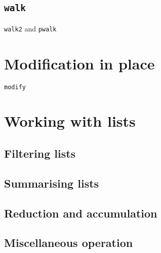 \documentclass[
]{book}
\begin{document}
\hypertarget{walk}{%
\subsection{\texorpdfstring{\texttt{walk}}{walk}}\label{walk}}

\texttt{walk2} and \texttt{pwalk}

\hypertarget{modification-in-place}{%
\section{Modification in place}\label{modification-in-place}}

\texttt{modify}

\hypertarget{working-with-lists}{%
\section{Working with lists}\label{working-with-lists}}

\hypertarget{filtering-lists}{%
\subsection{Filtering lists}\label{filtering-lists}}

\hypertarget{summarising-lists}{%
\subsection{Summarising lists}\label{summarising-lists}}

\hypertarget{reduction-and-accumulation}{%
\subsection{Reduction and accumulation}\label{reduction-and-accumulation}}

\hypertarget{miscellaneous-operation}{%
\subsection{Miscellaneous operation}\label{miscellaneous-operation}}
\end{document}
